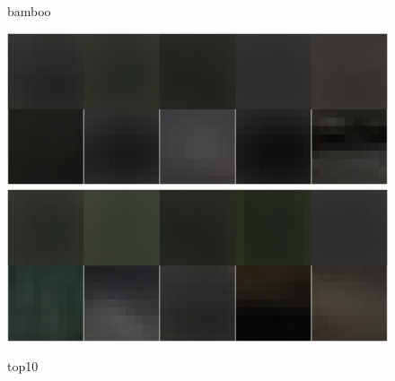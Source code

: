\documentclass[12pt]{article}
\begin{document}
\begin{figure}[!htbp]
\begin{minipage}[t]{0.2 \textwidth}
    \caption*{bamboo}
  \end{minipage}
  \begin{minipage}[t]{0.45 \textwidth}
    \centering \includegraphics[width= \linewidth]{./figures/bamboo_top10}
    \centering \includegraphics[width= \linewidth]{./figures/bamboo2_top10}  
    \caption*{top10}
  \end{minipage}


\end{figure}
\end{document}
